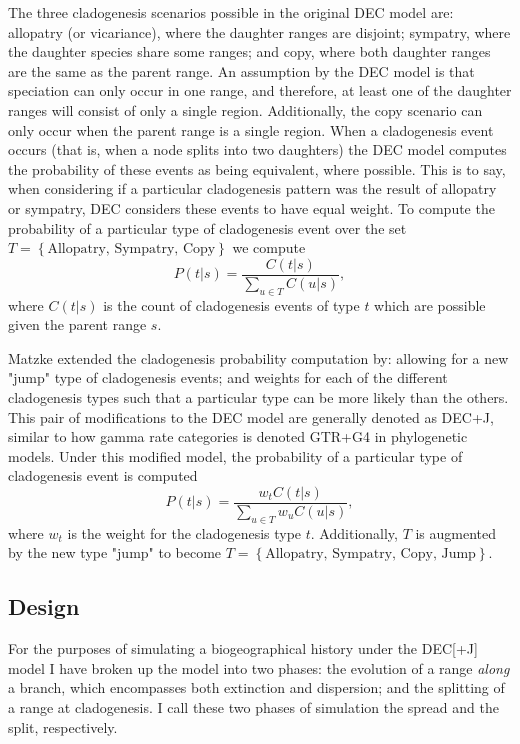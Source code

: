 \documentclass{article}
\begin{document}
The three cladogenesis scenarios possible in the original DEC model are:
allopatry (or vicariance), where the daughter ranges are disjoint; sympatry,
where the daughter species share some ranges; and copy, where both daughter
ranges are the same as the parent range.
An assumption by the DEC model is that speciation can only occur in one range,
and therefore, at least one of the daughter ranges will consist of only a
single region.
Additionally, the copy scenario can only occur when the parent range is a
single region.
When a cladogenesis event occurs (that is, when a node splits into two
daughters) the DEC model computes the probability of these events as being
equivalent, where possible.
This is to say, when considering if a particular cladogenesis pattern was the
result of allopatry or sympatry, DEC considers these events to have equal
weight.
To compute the probability of a particular type of cladogenesis event over the
set \(T = \left\{\text{Allopatry, Sympatry, Copy}\right\}\) we compute
\[
  P(t |
  s) = \frac{C(t | s)}{\sum_{u \in T} C(u | s)},
\]
where \( C(t|s) \) is the
count of cladogenesis events of type $ t $ which are possible given the parent
range \( s \).

Matzke\cite{ModelSelectionMatzke2014} extended the cladogenesis probability
computation by: allowing for a new "jump" type of cladogenesis events; and
weights for each of the different cladogenesis types such that a particular
type can be more likely than the others.
This pair of modifications to the DEC model are generally denoted as DEC+J,
similar to how gamma rate categories is denoted GTR+G4 in phylogenetic models.
Under this modified model, the probability of a particular type of cladogenesis
event is computed
\[
  P(t | s) = \frac{w_t C(t | s)}{\sum_{u \in T} w_u C(u |
    s)},
\]
where $w_t$ is the weight for the cladogenesis type $t$.
Additionally, $T$ is augmented by the new type "jump" to become \(T =
\left\{\text{Allopatry, Sympatry, Copy, Jump}\right\} \).

\subsection{Design}

For the purposes of simulating a biogeographical history under the DEC[+J]
model I have broken up the model into two phases: the evolution of a range
\textit{along} a branch, which encompasses both extinction and dispersion; and
the splitting of a range at cladogenesis.
I call these two phases of simulation the spread and the split, respectively.
\end{document}
